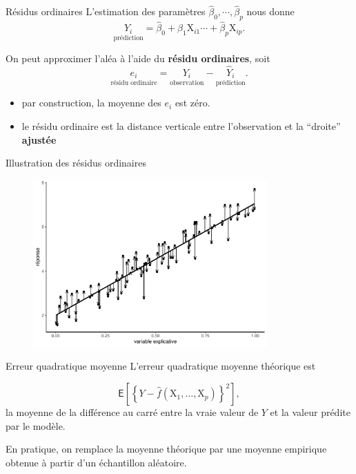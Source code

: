 \documentclass[
  ignorenonframetext,
]{beamer}
\providecommand{\tightlist}{%
  \setlength{\itemsep}{0pt}\setlength{\parskip}{0pt}}\usepackage{longtable,booktabs,array}
\begin{document}
\begin{frame}{Résidus ordinaires}
\protect\hypertarget{ruxe9sidus-ordinaires}{}
L'estimation des paramètres
\(\widehat{\beta}_0, \cdots, \widehat{\beta}_p\) nous donne
\[\underset{\text{prédiction}}{\widehat{Y}_i} = \widehat{\beta}_0 + \widehat{\beta}_1\mathrm{X}_{i1} \cdots + \widehat{\beta}_p\mathrm{X}_{ip}.\]

On peut approximer l'aléa à l'aide du \textbf{résidu ordinaires}, soit
\[\underset{\text{résidu ordinaire}}{e_i} = \underset{\text{observation}}{Y_i} - \underset{\text{prédiction}}{\widehat{Y}_i}.\]

\begin{itemize}
\tightlist
\item
  par construction, la moyenne des \(e_i\) est zéro.
\item
  le résidu ordinaire est la distance verticale entre l'observation et
  la ``droite'' \textbf{ajustée}
\end{itemize}
\end{frame}

\begin{frame}{Illustration des résidus ordinaires}
\protect\hypertarget{illustration-des-ruxe9sidus-ordinaires}{}
\begin{figure}

{\centering \includegraphics[width=0.8\textwidth,height=\textheight]{MATH60602-diapos4_files/figure-beamer/distancevert-1.pdf}

}

\end{figure}
\end{frame}

\begin{frame}{Erreur quadratique moyenne}
\protect\hypertarget{erreur-quadratique-moyenne}{}
L'erreur quadratique moyenne théorique est

\[\mathsf{E} \left[\left\{Y - \widehat{f}(\mathrm{X}_1, \ldots, \mathrm{X}_p)\right\}^2\right],\]
la moyenne de la différence au carré entre la vraie valeur de \(Y\) et
la valeur prédite par le modèle.

En pratique, on remplace la moyenne théorique par une moyenne empirique
obtenue à partir d'un échantillon aléatoire.
\end{frame}
\end{document}
